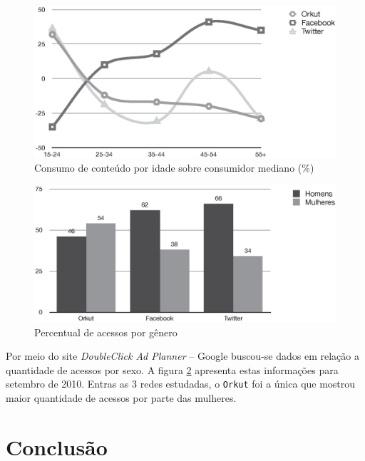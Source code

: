 \documentclass[12pt]{article}
\begin{document}
\begin{figure}[ht]
  \centering
  \includegraphics[width=0.86\linewidth]{redessociais_4_gray}
  \caption{Consumo de conteúdo por idade sobre consumidor mediano (\%) \label{fig:redes5}}
\end{figure}

\begin{figure}[ht]
  \centering
  \includegraphics[width=0.84\linewidth]{redessociais_genero_gray}
  \caption{Percentual de acessos por gênero \label{fig:redes-genero}}
\end{figure}

Por meio do site \textit{DoubleClick Ad Planner} -- Google
\cite{doubleclick} buscou-se dados em relação a quantidade de acessos
por sexo. A figura \ref{fig:redes-genero} apresenta estas
informações para setembro de 2010. Entras as 3 redes estudadas, o
\texttt{Orkut} foi a única
que mostrou maior quantidade de acessos por parte das
mulheres.

\section{Conclusão}






\end{document}
